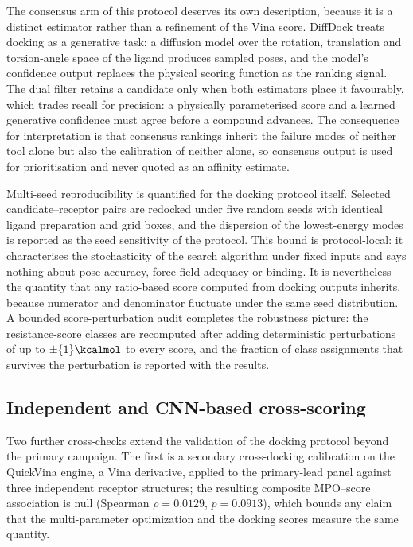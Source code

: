The consensus arm of this protocol deserves its own description, because it is a distinct estimator rather than a refinement of the Vina score. DiffDock treats docking as a generative task: a diffusion model over the rotation, translation and torsion-angle space of the ligand produces sampled poses, and the model's confidence output replaces the physical scoring function as the ranking signal\cite{Corso2023}. The dual filter retains a candidate only when both estimators place it favourably, which trades recall for precision: a physically parameterised score and a learned generative confidence must agree before a compound advances. The consequence for interpretation is that consensus rankings inherit the failure modes of neither tool alone but also the calibration of neither alone, so consensus output is used for prioritisation and never quoted as an affinity estimate.

Multi-seed reproducibility is quantified for the docking protocol itself. Selected candidate--receptor pairs are redocked under five random seeds with identical ligand preparation and grid boxes, and the dispersion of the lowest-energy modes is reported as the seed sensitivity of the protocol. This bound is protocol-local: it characterises the stochasticity of the search algorithm under fixed inputs and says nothing about pose accuracy, force-field adequacy or binding. It is nevertheless the quantity that any ratio-based score computed from docking outputs inherits, because numerator and denominator fluctuate under the same seed distribution. A bounded score-perturbation audit completes the robustness picture: the resistance-score classes are recomputed after adding deterministic perturbations of up to $\pm\qty{1}{\kcalmol}$ to every score, and the fraction of class assignments that survives the perturbation is reported with the results.

\subsection{Independent and CNN-based cross-scoring}

Two further cross-checks extend the validation of the docking protocol beyond the primary campaign. The first is a secondary cross-docking calibration on the QuickVina engine, a Vina derivative, applied to the primary-lead panel against three independent receptor structures; the resulting composite MPO--score association is null (Spearman $\rho = \num{0.0129}$, $p = \num{0.0913}$), which bounds any claim that the multi-parameter optimization and the docking scores measure the same quantity.

